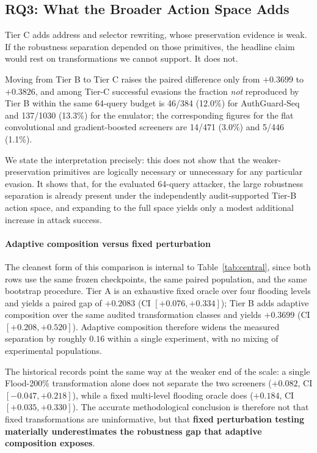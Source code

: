 \documentclass[conference]{IEEEtran}
\begin{document}
\subsection{RQ3: What the Broader Action Space Adds}
\label{sec:rq3}

Tier C adds address and selector rewriting, whose preservation evidence is weak. If the robustness separation depended on those primitives, the headline claim would rest on transformations we cannot support. It does not.

Moving from Tier B to Tier C raises the paired difference only from $+0.3699$ to $+0.3826$, and among Tier-C successful evasions the fraction \emph{not} reproduced by Tier B within the same 64-query budget is 46/384 (12.0\%) for AuthGuard-Seq and 137/1030 (13.3\%) for the emulator; the corresponding figures for the flat convolutional and gradient-boosted screeners are 14/471 (3.0\%) and 5/446 (1.1\%).

We state the interpretation precisely: this does not show that the weaker-preservation primitives are logically necessary or unnecessary for any particular evasion. It shows that, for the evaluated 64-query attacker, the large robustness separation is already present under the independently audit-supported Tier-B action space, and expanding to the full space yields only a modest additional increase in attack success.

\paragraph*{Adaptive composition versus fixed perturbation} The cleanest form of this comparison is internal to Table~\ref{tab:central}, since both rows use the same frozen checkpoints, the same paired population, and the same bootstrap procedure. Tier A is an exhaustive fixed oracle over four flooding levels and yields a paired gap of $+0.2083$ (CI $[+0.076,+0.334]$); Tier B adds adaptive composition over the same audited transformation classes and yields $+0.3699$ (CI $[+0.208,+0.520]$). Adaptive composition therefore widens the measured separation by roughly $0.16$ within a single experiment, with no mixing of experimental populations.

The historical records point the same way at the weaker end of the scale: a single Flood-200\% transformation alone does not separate the two screeners ($+0.082$, CI $[-0.047,+0.218]$), while a fixed multi-level flooding oracle does ($+0.184$, CI $[+0.035,+0.330]$). The accurate methodological conclusion is therefore not that fixed transformations are uninformative, but that \textbf{fixed perturbation testing materially underestimates the robustness gap that adaptive composition exposes}.
\end{document}
